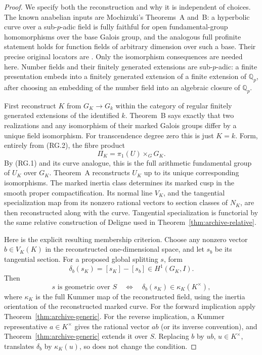 \begin{proof}
We specify both the reconstruction and why it is independent of
choices. The known anabelian inputs are Mochizuki's Theorems~A
and~B: a hyperbolic curve over a sub-$p$-adic field is fully faithful
for open fundamental-group homomorphisms over the base Galois
group, and the analogous full profinite statement holds for
function fields of arbitrary dimension over such a base.
Their precise original locators are
\cite[Theorem~A, p.~3; Theorem~B, p.~4;
Theorem~16.5 and the following profinite argument, p.~86;
Theorem~17.1 and proof, p.~87]{MochizukiLocal1999}.
Only the isomorphism consequences are needed here.
Number fields and their finitely generated extensions are sub-$p$-adic:
a finite presentation embeds into a finitely generated extension
of a finite extension of $\mathbb Q_p$, after choosing an
embedding of the number field into an algebraic closure of
$\mathbb Q_p$.

First reconstruct $K$ from $G_K\to G_k$ within the category of
regular finitely generated extensions of the identified $k$.
Theorem~B says exactly that two realizations and any isomorphism
of their marked Galois groups differ by a unique field isomorphism.
For transcendence degree zero this is just $K=k$.
Form, entirely from \textup{(RG.2)}, the fibre product
\[
 \Pi_K=\pi_1(U)\mathbin{\times}_G G_K.
\]
By (RG.1) and its curve analogue, this is the full arithmetic
fundamental group of $U_K$ over $G_K$. Theorem~A reconstructs
$U_K$ up to its unique corresponding isomorphisms. The marked
inertia class determines its marked cusp in the smooth proper
compactification. Its normal line $V_K$, and the tangential
specialization map from its nonzero rational vectors to section
classes of $N_K$, are then reconstructed along with the curve.
Tangential specialization is functorial by the same relative
construction of Deligne used in Theorem~\ref{thm:archive-relative}.

Here is the explicit resulting membership criterion. Choose any
nonzero vector $b\in V_K(K)$ in the reconstructed one-dimensional
space, and let $s_b$ be its tangential section. For a proposed
global splitting $s$, form
\[
 \delta_b(s_K)=[s_K]-[s_b]\in H^1(G_K,I).
\]
Then
\[
 s\text{ is geometric over }S
 \quad\Longleftrightarrow\quad
 \delta_b(s_K)\in
 \kappa_K(K^\times),                                      \tag{RG.3}
\]
where $\kappa_K$ is the full Kummer map of the reconstructed field,
using the inertia orientation of the reconstructed marked curve.
For the forward implication apply Theorem~\ref{thm:archive-generic}.
For the reverse implication, a Kummer representative $a\in K^\times$
gives the rational vector $ab$ (or its inverse convention), and
Theorem~\ref{thm:archive-generic} extends it over $S$.
Replacing $b$ by $ub$, $u\in K^\times$, translates
$\delta_b$ by $\kappa_K(u)$, so does not change the condition.


\end{proof}
